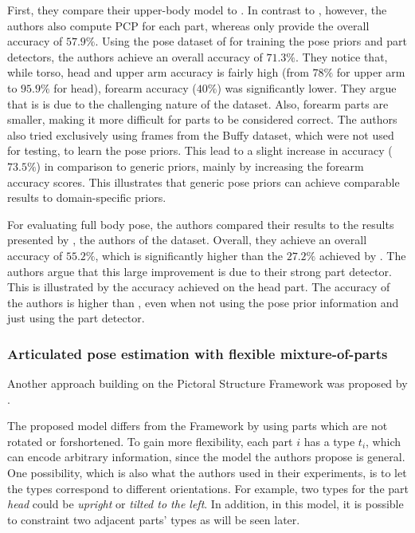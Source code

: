 First, they compare their upper-body model to \cite{ferrari_progressive_2008}.
In contrast to \cite{ferrari_progressive_2008}, however, the authors also compute PCP for each part, whereas \cite{ferrari_progressive_2008} only provide the overall accuracy of $57.9\%$.
Using the pose dataset of \cite{ramanan_learning_2007} for training the pose priors and part detectors, the authors achieve an overall accuracy of $71.3\%$.
They notice that, while torso, head and upper arm accuracy is fairly high (from $78\%$ for upper arm to $95.9\%$ for head), forearm accuracy ($40\%$) was significantly lower.
They argue that is is due to the challenging nature of the dataset.
Also, forearm parts are smaller, making it more difficult for parts to be considered correct.
The authors also tried exclusively using frames from the Buffy dataset, which were not used for testing, to learn the pose priors.
This lead to a slight increase in accuracy ($73.5\%$) in comparison to generic priors, mainly by increasing the forearm accuracy scores.
This illustrates that generic pose priors can achieve comparable results to domain-specific priors.

For evaluating full body pose, the authors compared their results to the results presented by \cite{ramanan_learning_2007}, the authors of the dataset.
Overall, they achieve an overall accuracy of $55.2\%$, which is significantly higher than the $27.2\%$ achieved by \cite{ramanan_learning_2007}.
The authors argue that this large improvement is due to their strong part detector.
This is illustrated by the accuracy achieved on the head part.
The accuracy of the authors is higher than \cite{ramanan_learning_2007}, even when not using the pose prior information and just using the part detector.




\subsubsection{Articulated pose estimation with flexible mixture-of-parts}

Another approach building on the Pictoral Structure Framework was proposed by \cite{yang_articulated_2011}.

The proposed model differs from the Framework by using parts which are not rotated or forshortened.
To gain more flexibility, each part $i$ has a type $t_i$, which can encode arbitrary information, since the model the authors propose is general.
One possibility, which is also what the authors used in their experiments, is to let the types correspond to different orientations.
For example, two types for the part \textit{head} could be \textit{upright} or \textit{tilted to the left}.
In addition, in this model, it is possible to constraint two adjacent parts' types as will be seen later.

